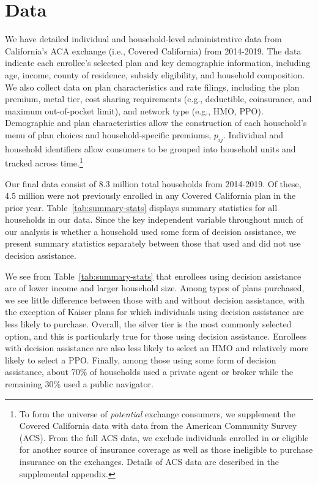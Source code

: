 \documentclass[12pt]{article}
\begin{document}
\section{Data}
\label{sec:data}
We have detailed individual and household-level administrative data from California's ACA exchange (i.e., Covered California) from 2014-2019. The data indicate each enrollee's selected plan and key demographic information, including age, income, county of residence, subsidy eligibility, and household composition. We also collect data on plan characteristics and rate filings, including the plan premium, metal tier, cost sharing requirements (e.g., deductible, coinsurance, and maximum out-of-pocket limit), and network type (e.g., HMO, PPO). Demographic and plan characteristics allow the construction of each household's menu of plan choices and household-specific premiums, $p_{ij}$. Individual and household identifiers allow consumers to be grouped into household units and tracked across time.\footnote{To form the universe of \textit{potential} exchange consumers, we supplement the Covered California data with data from the American Community Survey (ACS). From the full ACS data, we exclude individuals enrolled in or eligible for another source of insurance coverage as well as those ineligible to purchase insurance on the exchanges. Details of ACS data are described in the supplemental appendix.} 

Our final data consist of 8.3 million total households from 2014-2019. Of these, 4.5 million were not previously enrolled in any Covered California plan in the prior year. Table~\ref{tab:summary-stats} displays summary statistics for all households in our data. Since the key independent variable throughout much of our analysis is whether a household used some form of decision assistance, we present summary statistics separately between those that used and did not use decision assistance. 

We see from Table~\ref{tab:summary-stats} that enrollees using decision assistance are of lower income and larger household size. Among types of plans purchased, we see little difference between those with and without decision assistance, with the exception of Kaiser plans for which individuals using decision assistance are less likely to purchase. Overall, the silver tier is the most commonly selected option, and this is particularly true for those using decision assistance. Enrollees with decision assistance are also less likely to select an HMO and relatively more likely to select a PPO. Finally, among those using some form of decision assistance, about 70\% of households used a private agent or broker while the remaining 30\% used a public navigator.
\end{document}
